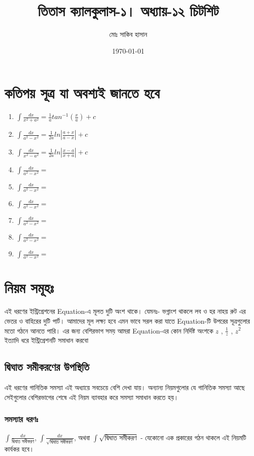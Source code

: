 \documentclass[12pt]{article}
\title{তিতাস ক্যালকুলাস-১। অধ্যায়-১২ চিটশিট }
\author{মোঃ সাকিব হাসান}
\date{\today}
\begin{document}
\maketitle



\newpage

\section{কতিপয় সূত্র যা অবশ্যই জানতে হবে}
\begin{enumerate}[i]
\item $\int\frac{dx}{x^2+a^2}=\frac{1}{a}tan^{-1}(\frac{x}{a})+c$
\item $\int\frac{dx}{a^2-x^2}=\frac{1}{2a}ln|\frac{a+x}{a-x}|+c$
\item $\int\frac{dx}{x^2-a^2}=\frac{1}{2a}ln|\frac{x-a}{x+a}|+c$
\item $\int\frac{dx}{a^2-x^2}=$
\item $\int\frac{dx}{a^2-x^2}=$
\item $\int\frac{dx}{a^2-x^2}=$
\item $\int\frac{dx}{a^2-x^2}=$
\item $\int\frac{dx}{a^2-x^2}=$
\item $\int\frac{dx}{a^2-x^2}=$
\end{enumerate}

\newpage

\section{নিয়ম সমূহঃ}
এই ধরণের ইন্ট্রিগ্রেশনের Equation-এ মূলত দুটি অংশ থাকে। যেমনঃ- ভগ্নাংশ থাকলে লব ও হর নাহয় রুট এর ভেতর ও বাহিরের দুটি পার্ট। আমাদের মূল লক্ষ্য হবে এমন ভাবে সরল করা যাতে Equation-টি উপরের সূত্রগুলোর মতো গঠনে আনতে পারি। এর জন্য বেশিরভাগ সময় আমরা Equation-এর কোন নির্দিষ্ট অংশকে $z$ , $\frac{1}{z}$ , $z^2$ ইত্যাদি ধরে ইন্ট্রিগ্রেশনটি সমাধান করবো

\subsection{দ্বিঘাত সমীকরণের উপস্থিতি}
এই ধরণের গানিতিক সমস্যা এই অধ্যায়ে সবচেয়ে বেশি দেখা যায়। অন্যান্য নিয়মগুলোর যে গানিতিক সমস্যা আছে সেইগুলোর বেশিরভাগের শেষে এই নিয়ম ব্যাবহার করে সমস্যা সমাধান করতে হয়।  \\

\subsubsection*{সমস্যার ধরণঃ} $\int\frac{dx}{\text{দ্বিঘাত সমীকরণ}} $, $\int\frac{dx}{\sqrt{\text{দ্বিঘাত সমীকরণ}}} $, অথবা $\int\sqrt{\text{দ্বিঘাত সমীকরণ}}$ - যেকোনো  এক প্রকারের গঠন থাকলে এই নিয়মটি কার্যকর হবে।
\end{document}
